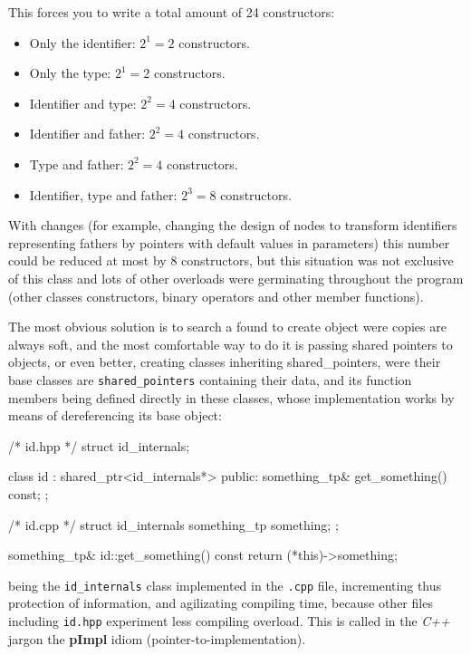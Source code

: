 \documentclass{article}
\begin{document}
\noindent This forces you to write a total amount of 24 constructors:

\begin{itemize}
\item Only the identifier: $2^1=2$ constructors.
\item Only the type: $2^1=2$ constructors.
\item Identifier and type: $2^2=4$ constructors.
\item Identifier and father: $2^2=4$ constructors.
\item Type and father: $2^2=4$ constructors.
\item Identifier, type and father: $2^3=8$ constructors.
\end{itemize}

With changes (for example, changing the design of nodes to transform identifiers
representing fathers by pointers with default values in parameters) this number
could be reduced at most by 8 constructors, but this situation was not exclusive
of this class and lots of other overloads were germinating throughout the
program (other classes constructors, binary operators and other member
functions).

The most obvious solution is to search a found to create object were copies are
always soft, and the most comfortable way to do it is passing shared pointers
to objects, or even better, creating classes inheriting shared\_pointers, were
their base classes are \texttt{shared\_pointers} containing their data, and its
function members being defined directly in these classes, whose implementation
works by means of dereferencing its base object:

\begin{Cpp}
  /* id.hpp */
  struct id_internals;

  class id : shared_ptr<id_internals*>
  {
  public:
     something_tp& get_something() const;
  };

  /* id.cpp */
  struct id_internals
  {
      something_tp something;
  };

  something_tp& id::get_something() const
  {
     return (*this)->something;
  }
\end{Cpp}

\noindent being the \texttt{id\_internals} class implemented in the
\texttt{.cpp} file, incrementing thus protection of information, and agilizating
compiling time, because other files including \texttt{id.hpp} experiment less
compiling overload. This is called in the \textit{C++} jargon the \textbf{pImpl}
idiom (pointer-to-implementation).
\end{document}
